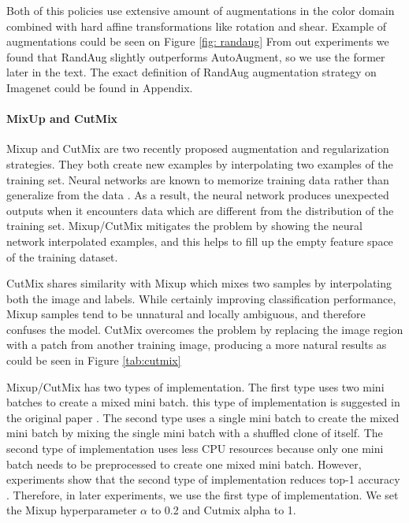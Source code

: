 Both of this policies use extensive amount of augmentations in the color domain combined with hard affine transformations like rotation and shear. Example of augmentations could be seen on Figure \ref{fig: randaug}
From out experiments we found that RandAug slightly outperforms AutoAugment, so we use the former later in the text. The exact definition of RandAug augmentation strategy on Imagenet could be found in Appendix. 


\paragraph{MixUp and CutMix}


Mixup \cite{zhang2017_mixup} and CutMix \cite{yun2019_cutmix} are two recently proposed augmentation and regularization strategies. They both create new examples by interpolating two examples of the training set. Neural networks are known to memorize training data rather than generalize from the data \cite{zhang2016_understanding_deep}. As a result, the neural network produces unexpected outputs when it encounters data which are different from the distribution of the training set. Mixup/CutMix mitigates the problem by showing the neural network interpolated examples, and this helps to fill up the empty feature space of the training dataset.



CutMix shares similarity with Mixup which mixes two samples by interpolating both the image and labels. While certainly improving classification performance, Mixup samples tend to be unnatural and locally ambiguous, and therefore confuses the model. CutMix overcomes the problem by replacing the image region with a patch from another training image, producing a more natural results as could be seen in Figure \ref{tab:cutmix}

Mixup/CutMix has two types of implementation. The first type uses two mini batches to create a mixed mini batch. this type of implementation is suggested in the original paper \cite{zhang2017_mixup}. The second type uses a single mini batch to create the mixed mini batch by mixing the single mini batch with a shuffled clone of itself. The second type of implementation uses less CPU resources because only one mini batch needs to be preprocessed to create one mixed mini batch. However, experiments show that the second type of implementation reduces top-1 accuracy \cite{lee2020_compounding_improvements}. Therefore, in later experiments, we use the first type of implementation. We set the Mixup hyperparameter $\alpha$ to 0.2 and Cutmix alpha to 1. 


